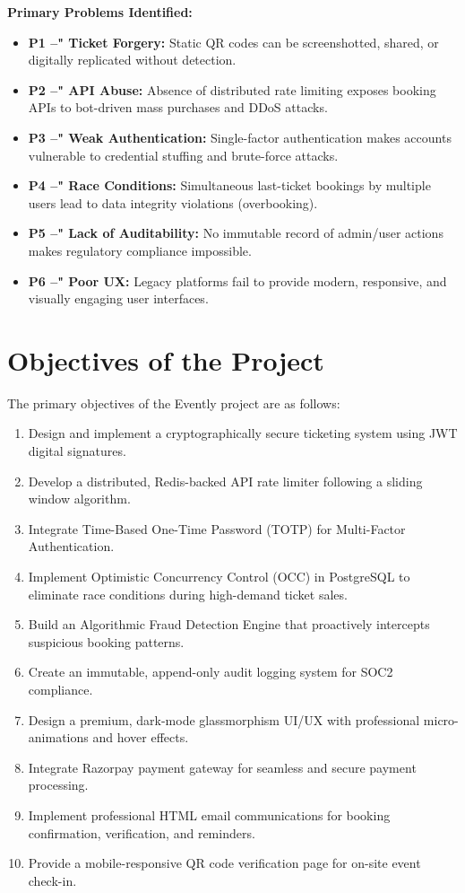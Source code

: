 \documentclass[12pt,a4paper]{report}
\begin{document}
\medskip
\noindent\textbf{Primary Problems Identified:}
\begin{itemize}[leftmargin=2em]
    \item \textbf{P1 --" Ticket Forgery:} Static QR codes can be screenshotted, shared, or digitally replicated without detection.
    \item \textbf{P2 --" API Abuse:} Absence of distributed rate limiting exposes booking APIs to bot-driven mass purchases and DDoS attacks.
    \item \textbf{P3 --" Weak Authentication:} Single-factor authentication makes accounts vulnerable to credential stuffing and brute-force attacks.
    \item \textbf{P4 --" Race Conditions:} Simultaneous last-ticket bookings by multiple users lead to data integrity violations (overbooking).
    \item \textbf{P5 --" Lack of Auditability:} No immutable record of admin/user actions makes regulatory compliance impossible.
    \item \textbf{P6 --" Poor UX:} Legacy platforms fail to provide modern, responsive, and visually engaging user interfaces.
\end{itemize}

\section{Objectives of the Project}
The primary objectives of the Evently project are as follows:
\begin{enumerate}[leftmargin=2em]
    \item Design and implement a cryptographically secure ticketing system using JWT digital signatures.
    \item Develop a distributed, Redis-backed API rate limiter following a sliding window algorithm.
    \item Integrate Time-Based One-Time Password (TOTP) for Multi-Factor Authentication.
    \item Implement Optimistic Concurrency Control (OCC) in PostgreSQL to eliminate race conditions during high-demand ticket sales.
    \item Build an Algorithmic Fraud Detection Engine that proactively intercepts suspicious booking patterns.
    \item Create an immutable, append-only audit logging system for SOC2 compliance.
    \item Design a premium, dark-mode glassmorphism UI/UX with professional micro-animations and hover effects.
    \item Integrate Razorpay payment gateway for seamless and secure payment processing.
    \item Implement professional HTML email communications for booking confirmation, verification, and reminders.
    \item Provide a mobile-responsive QR code verification page for on-site event check-in.
\end{enumerate}
\end{document}
